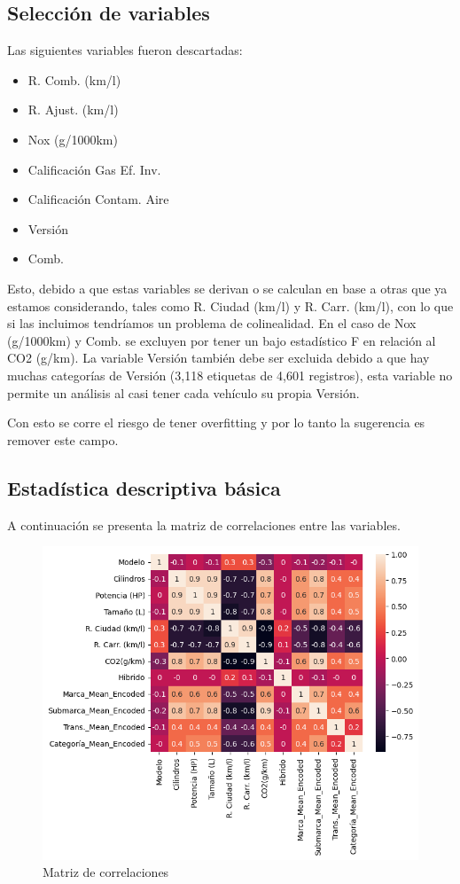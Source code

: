 \documentclass{article}
\begin{document}
\subsection{Selección de variables}

Las siguientes variables fueron descartadas:

\begin{itemize}
    \item R. Comb. (km/l)
    \item R. Ajust. (km/l)
    \item Nox (g/1000km)
    \item Calificación Gas Ef. Inv.
    \item Calificación Contam. Aire
    \item Versión
    \item Comb.
\end{itemize}

Esto, debido a que estas variables se derivan o se calculan en base a otras que ya estamos considerando, tales como R. Ciudad (km/l) y R. Carr. (km/l), con lo que si las incluimos tendríamos un problema de colinealidad. En el caso de Nox (g/1000km) y Comb. se excluyen por tener un bajo estadístico F en relación al CO2 (g/km). La variable Versión también debe ser excluida debido a que hay muchas categorías de Versión (3,118 etiquetas de 4,601 registros), esta variable no permite un análisis al casi tener cada vehículo su propia Versión.

Con esto se corre el riesgo de tener overfitting y por lo tanto la sugerencia es remover este campo.


\subsection{Estadística descriptiva básica}


A continuación se presenta la matriz de correlaciones entre las variables.
\newpage

\begin{figure}[h]
  \centering
  \includegraphics[width=1\linewidth]{imagenes/1_correlations.png}
  \caption{Matriz de correlaciones}
  \label{fig:nombre}
\end{figure}
\end{document}
